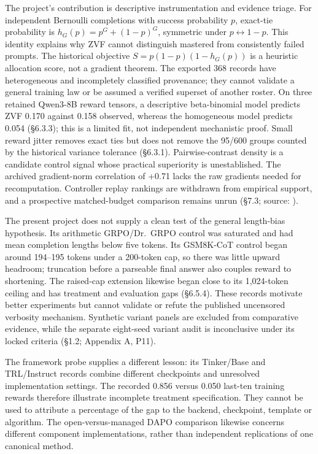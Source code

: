 \documentclass[12pt,a4paper]{report}
\DeclareRobustCommand{\longtok}[1]{\texttt{\seqsplit{#1}}}
\begin{document}
The project's contribution is descriptive instrumentation and evidence
triage. For independent Bernoulli completions with success probability
\(p\), exact-tie probability is \(h_G(p)=p^G+(1-p)^G\), symmetric under
\(p\leftrightarrow1-p\). This identity explains why ZVF cannot
distinguish mastered from consistently failed prompts. The historical
objective \(S=p(1-p)(1-h_G(p))\) is a heuristic allocation score, not a
gradient theorem. The exported 368 records have heterogeneous and
incompletely classified provenance; they cannot validate a general
training law or be assumed a verified superset of another roster. On
three retained Qwen3-8B reward tensors, a descriptive beta-binomial
model predicts ZVF 0.170 against 0.158 observed, whereas the homogeneous
model predicts 0.054 (§6.3.3); this is a limited fit, not independent
mechanistic proof. Small reward jitter removes exact ties but does not
remove the 95/600 groups counted by the historical variance tolerance
(§6.3.1). Pairwise-contrast density is a candidate control signal whose
practical superiority is unestablished. The archived gradient-norm
correlation of +0.71 lacks the raw gradients needed for recomputation.
Controller replay rankings are withdrawn from empirical support, and a
prospective matched-budget comparison remains unrun (§7.3; source:
\longtok{platform\_hybrid/paper/sections/p7\_intro.tex}).

The present project does not supply a clean test of the general
length-bias hypothesis. Its arithmetic GRPO/Dr.~GRPO control was
saturated and had mean completion lengths below five tokens. Its
GSM8K-CoT control began around 194--195 tokens under a 200-token cap, so
there was little upward headroom; truncation before a parseable final
answer also couples reward to shortening. The raised-cap extension
likewise began close to its 1,024-token ceiling and has treatment and
evaluation gaps (§6.5.4). These records motivate better experiments but
cannot validate or refute the published uncensored verbosity mechanism.
Synthetic variant panels are excluded from comparative evidence, while
the separate eight-seed variant audit is inconclusive under its locked
criteria (§1.2; Appendix A, P11).

The framework probe supplies a different lesson: its Tinker/Base and
TRL/Instruct records combine different checkpoints and unresolved
implementation settings. The recorded 0.856 versus 0.050 last-ten
training rewards therefore illustrate incomplete treatment
specification. They cannot be used to attribute a percentage of the gap
to the backend, checkpoint, template or algorithm. The
open-versus-managed DAPO comparison likewise concerns different
component implementations, rather than independent replications of one
canonical method.
\end{document}
